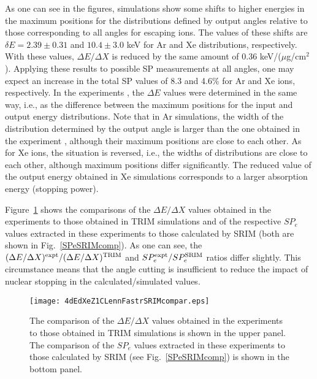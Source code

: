 \documentclass[aps,pra,twocolumn,amsmath,amssymb,floatfix]{revtex4-2}
\begin{document}
As one can see in the figures, simulations show some shifts to higher energies in the maximum positions for the distributions defined by output angles relative to those corresponding to all angles for escaping ions. The values of these shifts are $\delta E = 2.39\pm0.31$ and $10.4\pm3.0$ keV for Ar and Xe distributions, respectively. With these values, $\Delta E / \Delta X$ is reduced by the same amount of 0.36 keV/($\mu$g/cm$^{2}$). Applying these results to possible SP measurements at all angles, one may expect an increase in the total SP values of 8.3 and 4.6\% for Ar and Xe ions, respectively. In the experiments \cite{Fastrup66,Hvelp68,Lennard86}, the $\Delta E$ values were determined in the same way, i.e., as the difference between the maximum positions for the input and output energy distributions. Note that in Ar simulations, the width of the distribution determined by the output angle is larger than the one obtained in the experiment \cite{Fastrup66}, although their maximum positions are close to each other. As for Xe ions, the situation is reversed, i.e., the widths of distributions are close to each other, although maximum positions differ significantly. The reduced value of the output energy obtained in Xe simulations corresponds to a larger absorption energy (stopping power).

Figure~\ref{dEdXSPecomp} shows the comparisons of the $\Delta E/\Delta X$ values obtained in the experiments \cite{Fastrup66,Hvelp68,Lennard86} to those obtained in TRIM simulations and of the respective $SP_{e}$ values extracted in these experiments to those calculated by SRIM (both are shown in Fig.~\ref{SPeSRIMcomp}). As one can see, the $(\Delta E/\Delta X)^{\rm expt}/(\Delta E/\Delta X)^{\rm TRIM}$ and $SP_{e}^{\rm expt}/SP_{e}^{\rm SRIM}$ ratios differ slightly. This circumstance means that the angle cutting is insufficient to reduce the impact of nuclear stopping in the calculated/simulated values.

\begin{figure}[!h]  %
\begin{center}
\texttt{[image: 4dEdXeZ1CLennFastrSRIMcompar.eps]}
\caption{\label{dEdXSPecomp}The comparison of the $\Delta E/\Delta X$ values obtained in the experiments \cite{Fastrup66,Hvelp68,Lennard86} to those obtained in TRIM simulations is shown in the upper panel. The comparison of the $SP_{e}$ values extracted in these experiments to those calculated by SRIM (see  Fig.~\ref{SPeSRIMcomp}) is shown in the bottom panel.}
\end{center}
\end{figure}
\end{document}
